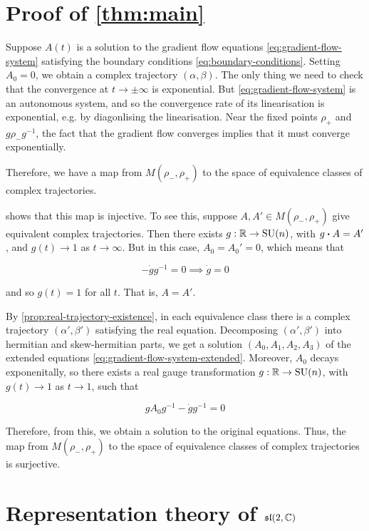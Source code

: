 \documentclass{article}
\DeclareMathOperator{\SU}{SU}
\renewcommand{\sl}{\mathfrak{sl}}
\begin{document}
\section{Proof of \cref{thm:main}}

Suppose \(A(t)\) is a solution to the gradient flow equations \cref{eq:gradient-flow-system} satisfying the boundary conditions \cref{eq:boundary-conditions}. Setting \(A_0 = 0\), we obtain a complex trajectory \((\alpha, \beta)\). The only thing we need to check that the convergence at \(t \to \pm\infty\) is exponential. But \cref{eq:gradient-flow-system} is an autonomous system, and so the convergence rate of its linearisation is exponential, e.g. by diagonlising the linearisation. Near the fixed points \(\rho_+\) and \(g\rho_-g^{-1}\), the fact that the gradient flow converges implies that it must converge exponentially.

Therefore, we have a map from \(M(\rho_-, \rho_+)\) to the space of equivalence classes of complex trajectories. 

 shows that this map is injective. To see this, suppose \(A, A' \in M(\rho_-, \rho_+)\) give equivalent complex trajectories. Then there exists \(g : \R \to \SU(n)\), with \(g \vdot A = A'\), and \(g(t) \to 1\) as \(t \to \infty\). But in this case, \(A_0 = A_0' = 0\), which means that

\[-\dot g g^{-1} = 0 \implies \dot g = 0\]

and so \(g(t) = 1\) for all \(t\). That is, \(A = A'\).

By \cref{prop:real-trajectory-existence}, in each equivalence class there is a complex trajectory \((\alpha', \beta')\) satisfying the real equation. Decomposing \((\alpha', \beta')\) into hermitian and skew-hermitian parts, we get a solution \((A_0, A_1, A_2, A_3)\) of the extended equations \cref{eq:gradient-flow-system-extended}. Moreover, \(A_0\) decays exponenitally, so there exists a real gauge transformation \(g : \R \to \SU(n)\), with \(g(t) \to 1\) as \(t \to 1\), such that

\[gA_0g^{-1} - \dot g g^{-1} = 0\]

Therefore, from this, we obtain a solution to the original equations. Thus, the map from \(M(\rho_-, \rho_+)\) to the space of equivalence classes of complex trajectories is surjective.

\label{sec:proof}

\appendix

\section{Representation theory of \(\sl(2, \C)\)}
\end{document}
